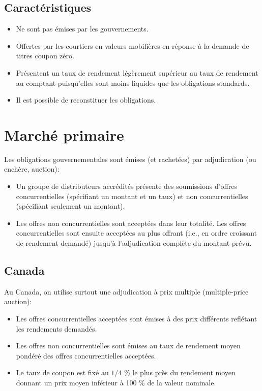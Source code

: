\documentclass[12pt]{article}
\begin{document}
\subsection{Caractéristiques}
\begin{itemize}
\item Ne sont pas émises par les gouvernements.
\item Offertes par les courtiers en valeurs mobilières en réponse à la demande de titres coupon zéro.
\item Présentent un taux de rendement légèrement supérieur au taux de rendement au comptant puisqu’elles sont moins liquides que les obligations standards.
\item Il est possible de reconstituer les obligations.
\end{itemize}
\section{Marché primaire}
Les obligations gouvernementales sont émises (et rachetées) par adjudication (ou enchère, auction):
\begin{itemize}
\item Un groupe de distributeurs accrédités présente des soumissions d’offres concurrentielles (spécifiant un montant et un taux) et non concurrentielles (spécifiant seulement un montant).  
\item Les offres non concurrentielles sont acceptées dans leur totalité. Les offres concurrentielles sont ensuite acceptées au plus offrant (i.e., en ordre croissant de rendement demandé) jusqu’à l’adjudication complète du montant prévu. 
\end{itemize}
\subsection{Canada}
Au Canada, on utilise surtout une adjudication à prix multiple (multiple-price auction):  
\begin{itemize}
\item Les offres concurrentielles acceptées sont émises à des prix différents reflétant les rendements demandés.  
\item Les offres non concurrentielles sont émises au taux de rendement moyen pondéré des offres concurrentielles acceptées.
\item Le taux de coupon est fixé au $1/4$ \% le plus près du rendement moyen donnant un prix moyen inférieur à 100 \% de la valeur nominale.  
\end{itemize}
\end{document}
